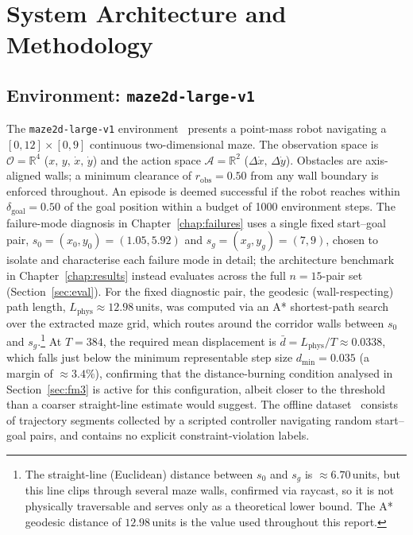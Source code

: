 \documentclass[12pt, a4paper, oneside]{report}
\theoremstyle{definition}
\newcommand{\R}{\mathbb{R}}
\begin{document}
\chapter{System Architecture and Methodology}
\label{chap:methodology}

\section{Environment: \texttt{maze2d-large-v1}}
\label{sec:env}

The \texttt{maze2d-large-v1} environment~\citep{fu2020d4rl}
presents a point-mass robot navigating a $[0,12]\times[0,9]$
continuous two-dimensional maze. The observation space is
$\mathcal{O} = \R^4$ ($x,\,y,\,\dot{x},\,\dot{y}$) and the action
space $\mathcal{A} = \R^2$ ($\Delta\dot{x},\,\Delta\dot{y}$).
Obstacles are axis-aligned walls; a minimum clearance of
$r_{\mathrm{obs}} = 0.50$ from any wall boundary is enforced
throughout. An episode is deemed successful if the robot reaches
within $\delta_{\mathrm{goal}} = 0.50$ of the goal position within a
budget of 1000 environment steps. The failure-mode diagnosis in
Chapter~\ref{chap:failures} uses a single fixed start--goal pair,
$s_0 = (x_0, y_0) = (1.05, 5.92)$ and
$s_g = (x_g, y_g) = (7, 9)$, chosen to isolate and characterise
each failure mode in detail; the architecture benchmark in
Chapter~\ref{chap:results} instead evaluates across the full
$n=15$-pair set (Section~\ref{sec:eval}). For the fixed diagnostic
pair, the geodesic (wall-respecting) path length,
$L_{\mathrm{phys}} \approx 12.98$\,units, was computed via an A*
shortest-path search over the extracted maze grid, which routes
around the corridor walls between $s_0$ and $s_g$.\footnote{The
straight-line (Euclidean) distance between $s_0$ and $s_g$ is
$\approx 6.70$\,units, but this line clips through several maze
walls, confirmed via raycast, so it is not physically traversable
and serves only as a theoretical lower bound. The A* geodesic
distance of $12.98$\,units is the value used throughout this
report.} At $T = 384$, the required mean displacement is
$\bar{d} = L_{\mathrm{phys}}/T \approx 0.0338$, which falls just
below the minimum representable step size $d_{\min} = 0.035$
(a margin of $\approx 3.4\%$), confirming that the distance-burning
condition analysed in Section~\ref{sec:fm3} is active for this
configuration, albeit closer to the threshold than a coarser
straight-line estimate would suggest.
The offline dataset~\citep{fu2020d4rl} consists of trajectory
segments collected by a scripted controller navigating random
start--goal pairs, and contains no explicit constraint-violation
labels.
\end{document}

